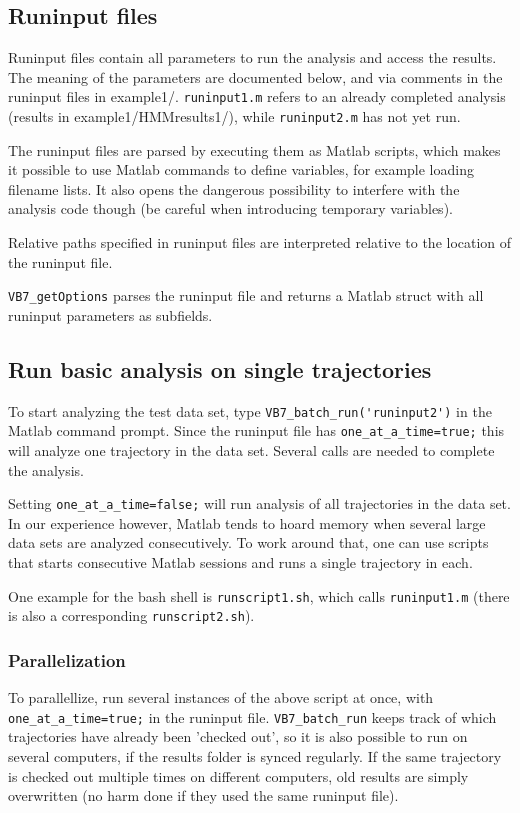 \subsection{Runinput files} 
Runinput files contain all parameters to run the analysis and access
the results. The meaning of the parameters are documented below, and
via comments in the runinput files in example1/.  \verb+runinput1.m+
refers to an already completed analysis (results in
example1/HMMresults1/), while \verb+runinput2.m+ has not yet run.

The runinput files are parsed by executing them as Matlab scripts,
which makes it possible to use Matlab commands to define variables,
for example loading filename lists. It also opens the dangerous
possibility to interfere with the analysis code though (be careful when
introducing temporary variables).

Relative paths specified in runinput files are interpreted relative to
the location of the runinput file.

\texttt{VB7\_getOptions} parses the runinput file and returns a Matlab
struct with all runinput parameters as subfields.

\subsection{Run basic analysis on single trajectories}
To start analyzing the test data set, type
\verb+VB7_batch_run('runinput2')+ in the Matlab command prompt. Since
the runinput file has \verb+one_at_a_time=true;+ this will analyze one
trajectory in the data set. Several calls are needed to complete the
analysis. 

Setting \verb+one_at_a_time=false;+ will run analysis of all
trajectories in the data set. In our experience however, Matlab tends
to hoard memory when several large data sets are analyzed
consecutively.  To work around that, one can use scripts that starts
consecutive Matlab sessions and runs a single trajectory in each.

One example for the bash shell is \verb+runscript1.sh+, which calls
\verb+runinput1.m+ (there is also a corresponding
\verb+runscript2.sh+).

\subsubsection*{Parallelization}
To parallellize, run several instances of the above script at once,
with \verb+one_at_a_time=true;+ in the runinput
file. \verb+VB7_batch_run+ keeps track of which trajectories have
already been 'checked out', so it is also possible to run on several
computers, if the results folder is synced regularly. If the same
trajectory is checked out multiple times on different computers, old
results are simply overwritten (no harm done if they used the same
runinput file).

